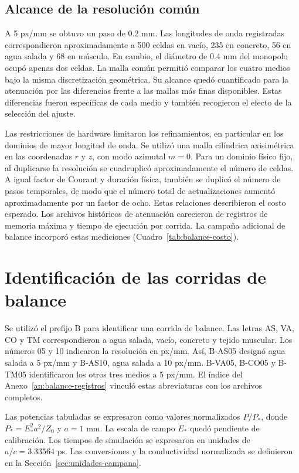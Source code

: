 \subsection{Alcance de la resolución común}
A 5 px/mm se obtuvo un paso de 0.2 mm. Las longitudes de onda registradas correspondieron aproximadamente a 500 celdas en vacío, 235 en concreto, 56 en agua salada y 68 en músculo. En cambio, el diámetro de 0.4 mm del monopolo ocupó apenas dos celdas. La malla común permitió comparar los cuatro medios bajo la misma discretización geométrica. Su alcance quedó cuantificado para la atenuación por las diferencias frente a las mallas más finas disponibles. Estas diferencias fueron específicas de cada medio y también recogieron el efecto de la selección del ajuste.

Las restricciones de hardware limitaron los refinamientos, en particular en los dominios de mayor longitud de onda. Se utilizó una malla cilíndrica axisimétrica en las coordenadas $r$ y $z$, con modo azimutal $m=0$. Para un dominio físico fijo, al duplicarse la resolución se cuadruplicó aproximadamente el número de celdas. A igual factor de Courant y duración física, también se duplicó el número de pasos temporales, de modo que el número total de actualizaciones aumentó aproximadamente por un factor de ocho. Estas relaciones describieron el costo esperado. Los archivos históricos de atenuación carecieron de registros de memoria máxima y tiempo de ejecución por corrida. La campaña adicional de balance incorporó estas mediciones (Cuadro~\ref{tab:balance-costo}).

\section{Identificación de las corridas de balance}
Se utilizó el prefijo B para identificar una corrida de balance. Las letras AS, VA, CO y TM correspondieron a agua salada, vacío, concreto y tejido muscular. Los números 05 y 10 indicaron la resolución en px/mm. Así, B-AS05 designó agua salada a 5 px/mm y B-AS10, agua salada a 10 px/mm. B-VA05, B-CO05 y B-TM05 identificaron los otros tres medios a 5 px/mm. El índice del Anexo~\ref{an:balance-registros} vinculó estas abreviaturas con los archivos completos.

Las potencias tabuladas se expresaron como valores normalizados $P/P_*$, donde $P_*=E_*^2a^2/Z_0$ y $a=1$ mm. La escala de campo $E_*$ quedó pendiente de calibración. Los tiempos de simulación se expresaron en unidades de $a/c=3.33564$ ps. Las conversiones y la conductividad normalizada se definieron en la Sección~\ref{sec:unidades-campana}.


